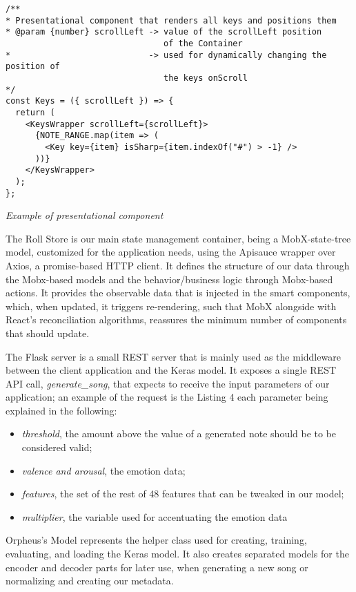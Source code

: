 \begin{listing}
  \begin{verbatim}
/**
* Presentational component that renders all keys and positions them
* @param {number} scrollLeft -> value of the scrollLeft position
                                of the Container
*                            -> used for dynamically changing the position of
                                the keys onScroll
*/
const Keys = ({ scrollLeft }) => {
  return (
    <KeysWrapper scrollLeft={scrollLeft}>
      {NOTE_RANGE.map(item => (
        <Key key={item} isSharp={item.indexOf("#") > -1} />
      ))}
    </KeysWrapper>
  );
};
  \end{verbatim}
  \caption{\emph{Example of presentational component}}
  \label{lst:dumb}
\end{listing}


The Roll Store is our main state management container,
being a MobX-state-tree model,
customized for the application needs,
using the Apisauce wrapper over Axios,
a promise-based HTTP client.
It defines the structure of our data through the Mobx-based
models and the behavior/business logic through Mobx-based actions. It provides the observable data that is injected in the smart components, which, when updated, it triggers re-rendering, such that MobX alongside with React's reconciliation algorithms, reassures the minimum number of components that should update.


The Flask server is a small REST server that is mainly used
as the middleware between the client application and the
Keras model. It exposes a single REST API call,
\emph{generate\_song}, that expects to receive the
input parameters of our application;
an example of the request is the Listing 4
each parameter being explained in the following:
\begin{itemize}
  \item \emph{threshold}, the amount above the value of a generated note should be to be considered valid;
  \item \emph{valence and arousal}, the emotion data;
  \item \emph{features}, the set of the rest of 48 features that can be tweaked in our model;
  \item \emph{multiplier}, the variable used for accentuating the emotion data
\end{itemize}

Orpheus's Model represents the helper class used for creating,
training, evaluating, and loading the Keras model.
It also creates separated models for the encoder and decoder parts
for later use, when generating a new song or
normalizing and creating our metadata.

